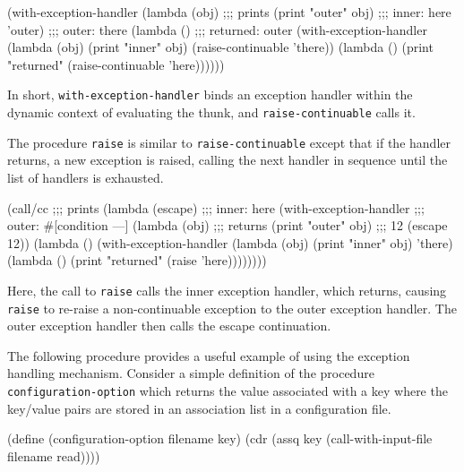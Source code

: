\documentclass[onecolumn, 12pt, twoside, openright, dvipdfm]{book}
\begin{document}
\begin{CodeInline}
(with-exception-handler
  (lambda (obj)                         ;;; prints
    (print "outer" obj)                 ;;;   inner: here    
    'outer)                             ;;;   outer: there   
  (lambda ()                            ;;;   returned: outer
    (with-exception-handler
      (lambda (obj)
        (print "inner" obj)
        (raise-continuable 'there))
      (lambda ()
        (print "returned" (raise-continuable 'here))))))
\end{CodeInline}

In short, \texttt{with-exception-handler} binds an exception handler
within the dynamic context of evaluating the thunk, and
\texttt{raise-continuable} calls it.

The procedure \texttt{raise} is similar to
\texttt{raise-continuable} except that if the handler returns, a new
exception is raised, calling the next handler in sequence until the
list of handlers is exhausted.

\begin{CodeInline}
(call/cc                          ;;; prints
  (lambda (escape)                ;;;   inner: here
    (with-exception-handler       ;;;   outer: #[condition ---]
      (lambda (obj)               ;;; returns
        (print "outer" obj)       ;;;   12
        (escape 12))
      (lambda ()                            
        (with-exception-handler            
          (lambda (obj)
            (print "inner" obj)
            'there)
          (lambda ()
            (print "returned" (raise 'here))))))))
\end{CodeInline}

Here, the call to \texttt{raise} calls the inner exception handler,
which returns, causing \texttt{raise} to re-raise a non-continuable 
exception to the outer exception handler.  The outer exception
handler then calls the escape continuation.

The following procedure provides a useful example of using the
exception handling mechanism.  Consider a simple definition of the
procedure \texttt{configuration-option} which returns the value
associated with a key where the key/value pairs are stored in an
association list in a configuration file.

\begin{CodeInline}
(define (configuration-option filename key)
  (cdr (assq key (call-with-input-file filename read))))
\end{CodeInline}
\end{document}
